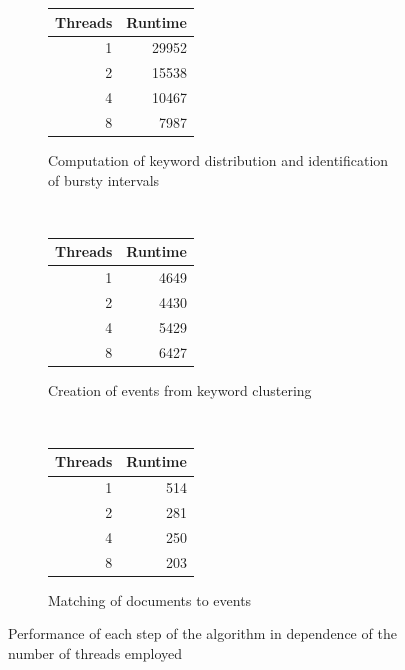 
\begin{figure}
	\centering
	\begin{subfigure}[t]{0.3\textwidth}
		\begin{tabular}{r | r}
			\textbf{Threads} & \textbf{Runtime}\\
			\hline
			1 & 29952\\
			2 & 15538\\
			4 & 10467\\
			8 & 7987
		\end{tabular}
		\caption{Computation of keyword distribution and identification of bursty intervals}
	\end{subfigure}~
	\begin{subfigure}[t]{0.3\textwidth}
		\begin{tabular}{r | r}
			\textbf{Threads} & \textbf{Runtime}\\
			\hline
			1 & 4649\\
			2 & 4430\\
			4 & 5429\\
			8 & 6427
		\end{tabular}
		\caption{Creation of events from keyword clustering}
	\end{subfigure}~
	\begin{subfigure}[t]{0.3\textwidth}
		\begin{tabular}{r | r}
			\textbf{Threads} & \textbf{Runtime}\\
			\hline
			1 & 514\\
			2 & 281\\
			4 & 250\\
			8 & 203
		\end{tabular}
		\caption{Matching of documents to events}
	\end{subfigure}
	\caption{Performance of each step of the algorithm in dependence of the number of threads employed}
	\label{fig:scalability}
\end{figure}
